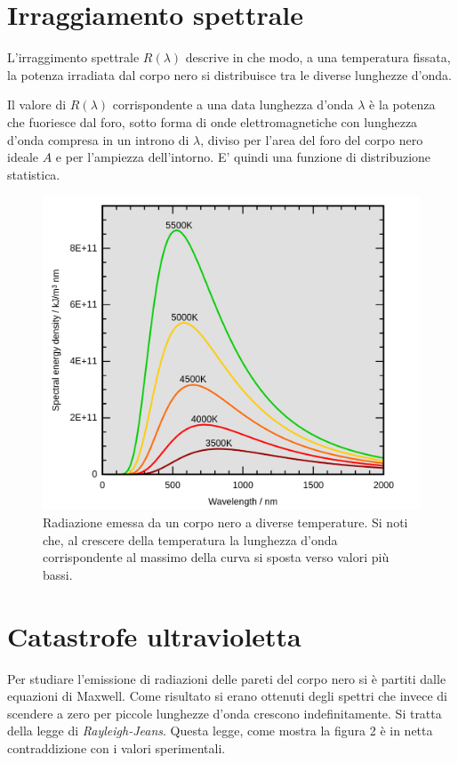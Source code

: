 \documentclass[12pt,twoside]{report}
\begin{document}
\section{Irraggiamento spettrale}
\par{L'irraggimento spettrale $R(\lambda)$ descrive in che modo, a una temperatura fissata, la potenza irradiata dal corpo nero si distribuisce tra le diverse lunghezze d'onda.}
\par{Il valore  di $R(\lambda)$ corrispondente a una data lunghezza d'onda $\lambda$ è la potenza che fuoriesce dal foro, sotto forma di onde elettromagnetiche con lunghezza d'onda compresa in un introno di $\lambda$, diviso per l'area del foro del corpo nero ideale $A$ e per l'ampiezza dell'intorno. E’ quindi una funzione di distribuzione statistica. }

\begin{figure}[h]
\centering
\includegraphics[width = 0.7\hsize]{./figures/radCorpoNero}
\caption{Radiazione emessa da un corpo nero a diverse temperature. \newline Si noti che, al crescere della temperatura la lunghezza d’onda corrispondente al massimo della curva si sposta verso valori più bassi.}
\label{fig:logo}
\end{figure}

\section{Catastrofe ultravioletta}
\par{Per studiare l’emissione di radiazioni delle pareti del corpo nero si è partiti dalle equazioni di Maxwell. Come risultato si erano ottenuti degli spettri che invece di scendere a zero per piccole lunghezze d’onda crescono indefinitamente. Si tratta della legge di \textit{Rayleigh-Jeans}.
Questa legge, come mostra la figura 2 è in netta contraddizione con i valori sperimentali.}
\end{document}
